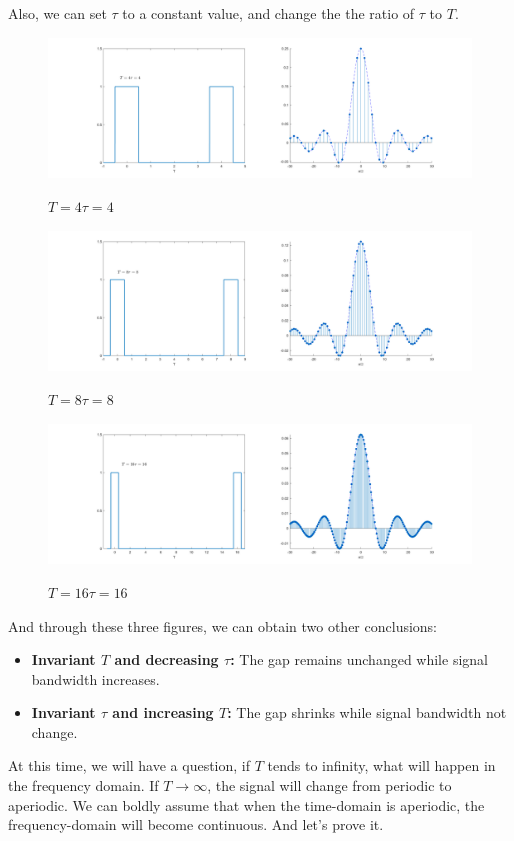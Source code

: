 \documentclass[margin,line]{res}
\begin{document}
\begin{resume}
Also, we can set $\tau$ to a constant value, and change the the ratio of $\tau$ to $T$.
\begin{figure}[H]
	\centerline{\includegraphics[width=0.9\linewidth]{figure/bw_4.png}}
	\centerline{\textbf{$T = 4\tau = 4$}}
\end{figure}
\begin{figure}[H]
	\centerline{\includegraphics[width=0.9\linewidth]{figure/bw_5.png}}
	\centerline{\textbf{$T = 8\tau = 8$}}
\end{figure}
\begin{figure}[H]
	\centerline{\includegraphics[width=0.9\linewidth]{figure/bw_6.png}}
	\centerline{\textbf{$T = 16\tau = 16$}}
\end{figure}
And through these three figures, we can obtain two other conclusions:
\begin{itemize}
	\item \textbf{Invariant $T$ and decreasing $\tau$:} The gap remains unchanged while signal bandwidth increases.
	\item \textbf{Invariant $\tau$ and increasing $T$:} The gap shrinks while signal bandwidth not change.
\end{itemize}
At this time, we will have a question, if $T$ tends to infinity, what will happen in the frequency domain. If $T\rightarrow \infty$, the signal will change from periodic to aperiodic. We can boldly assume that when the time-domain is aperiodic, the frequency-domain will become continuous. And let's prove it.
\clearpage


\end{resume}
\end{document}
